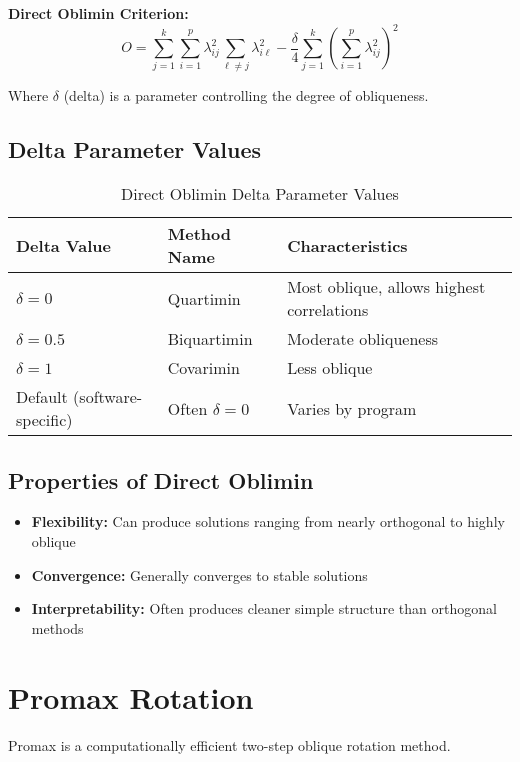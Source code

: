 \documentclass[a4paper]{tufte-book}
\begin{document}
\begin{mathconcept}
\textbf{Direct Oblimin Criterion:}
$$O = \sum_{j=1}^{k} \sum_{i=1}^{p} \lambda_{ij}^2 \sum_{\ell \neq j} \lambda_{i\ell}^2 - \frac{\delta}{4} \sum_{j=1}^{k} \left(\sum_{i=1}^{p} \lambda_{ij}^2\right)^2$$

Where $\delta$ (delta) is a parameter controlling the degree of obliqueness.
\end{mathconcept}

\subsection{Delta Parameter Values}

\begin{table}[h]
\centering
\caption{Direct Oblimin Delta Parameter Values}
\begin{tabular}{@{}lll@{}}
\toprule
\textbf{Delta Value} & \textbf{Method Name} & \textbf{Characteristics} \\
\midrule
$\delta = 0$ & Quartimin & Most oblique, allows highest correlations \\
$\delta = 0.5$ & Biquartimin & Moderate obliqueness \\
$\delta = 1$ & Covarimin & Less oblique \\
Default (software-specific) & Often $\delta = 0$ & Varies by program \\
\bottomrule
\end{tabular}
\end{table}

\subsection{Properties of Direct Oblimin}

\begin{itemize}
\item \textbf{Flexibility:} Can produce solutions ranging from nearly orthogonal to highly oblique
\item \textbf{Convergence:} Generally converges to stable solutions
\item \textbf{Interpretability:} Often produces cleaner simple structure than orthogonal methods
\end{itemize}

\section{Promax Rotation}

Promax is a computationally efficient two-step oblique rotation method.
\end{document}
